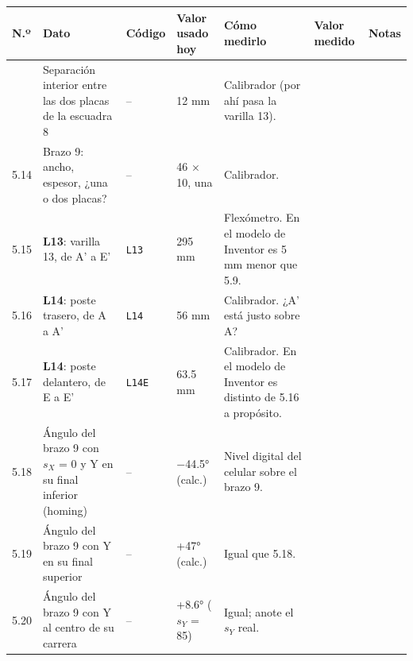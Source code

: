 \documentclass[10pt]{article}
\makeatletter
\newenvironment{medidas}{%
  \small
  \begin{longtable}{@{}L{0.9cm}L{5.0cm}L{2.3cm}L{2.7cm}L{6.4cm}>{\columncolor{fondo}}L{3.1cm}L{2.4cm}@{}}
  \toprule
  \textbf{N.º} & \textbf{Dato} & \textbf{Código} & \textbf{Valor usado hoy} & \textbf{Cómo medirlo} & \textbf{Valor medido} & \textbf{Notas}\\
  \midrule\endhead
  \bottomrule\endfoot}{\end{longtable}}
\newcommand{\cod}[1]{\texttt{\footnotesize #1}}
\makeatother
\begin{document}
\begin{medidas}
5.13 & Separación interior entre las dos placas de la escuadra 8 & -- & 12 mm & Calibrador (por ahí pasa la varilla 13). & & \\
5.14 & Brazo 9: ancho, espesor, ¿una o dos placas? & -- & 46 × 10, una & Calibrador. & & \\
5.15 & \textbf{L13}: varilla 13, de A' a E' & \cod{L13} & 295 mm & Flexómetro. En el modelo de Inventor es 5 mm menor que 5.9. & & \\
5.16 & \textbf{L14}: poste trasero, de A a A' & \cod{L14} & 56 mm & Calibrador. ¿A' está justo sobre A? & & \\
5.17 & \textbf{L14}: poste delantero, de E a E' & \cod{L14E} & 63.5 mm & Calibrador. En el modelo de Inventor es distinto de 5.16 a propósito. & & \\
5.18 & Ángulo del brazo 9 con $s_X$ = 0 y Y en su final inferior (homing) & -- & $-$44.5° (calc.) & Nivel digital del celular sobre el brazo 9. & & \\
5.19 & Ángulo del brazo 9 con Y en su final superior & -- & +47° (calc.) & Igual que 5.18. & & \\
5.20 & Ángulo del brazo 9 con Y al centro de su carrera & -- & +8.6° ($s_Y$ = 85) & Igual; anote el $s_Y$ real. & & \\
\end{medidas}

\end{document}
